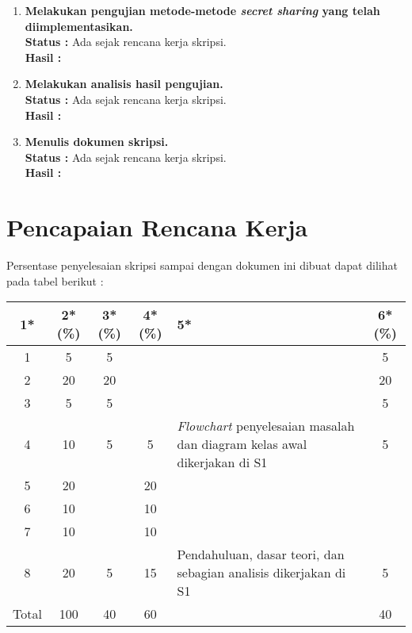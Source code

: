 \documentclass[a4paper,twoside]{article}
\begin{document}
\begin{enumerate}
		\item \textbf{Melakukan pengujian metode-metode \textit{secret sharing} yang telah diimplementasikan.}\\
		{\bf Status :} Ada sejak rencana kerja skripsi. \\
		{\bf Hasil :} 

		\item \textbf{Melakukan analisis hasil pengujian.} \\
		{\bf Status :} Ada sejak rencana kerja skripsi.\\
		{\bf Hasil :}

		\item \textbf{Menulis dokumen skripsi.}\\
		{\bf Status :} Ada sejak rencana kerja skripsi.\\
		{\bf Hasil :} 
	
	\end{enumerate}

\section{Pencapaian Rencana Kerja}
Persentase penyelesaian skripsi sampai dengan dokumen ini dibuat dapat dilihat pada tabel berikut :

\begin{center}
\begin{tabular}{ | c | c | c | c | l | c |}
    \hline
    1*  & 2*(\%) & 3*(\%) & 4*(\%) & 5* & 6*(\%)\\ \hline \hline
    1   & 5 & 5 &  &  & 5\\ \hline
    2   & 20 & 20 &  &  & 20\\ \hline
    3   & 5 & 5 &  &  & 5\\ \hline
    4   & 10 & 5 & 5 & {\footnotesize \textit{Flowchart} penyelesaian masalah dan diagram kelas awal dikerjakan di S1} & 5\\ \hline
    5   & 20 &   & 20 &  &\\ \hline
    6   & 10 &   & 10 &  &\\ \hline
    7   & 10 &   & 10 &  &\\ \hline
    8   & 20 & 5 & 15 & {\footnotesize Pendahuluan, dasar teori, dan sebagian analisis dikerjakan di S1} & 5\\ \hline
    Total  & 100  & 40  & 60 &  & 40\\ \hline
\end{tabular}
\end{center}
\end{document}
